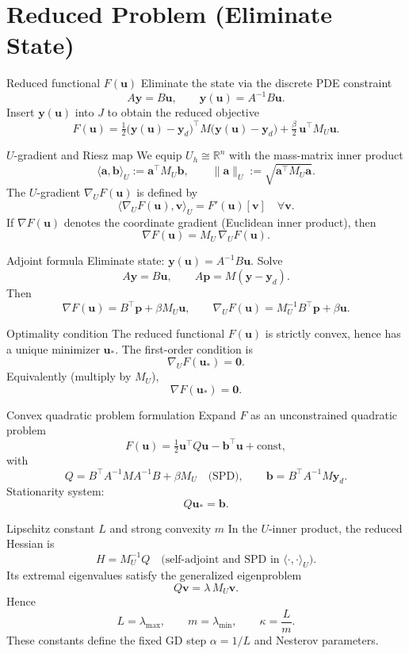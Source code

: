 \documentclass[aspectratio=169,11pt]{beamer}
\begin{document}
\section{Reduced Problem (Eliminate State)}

\begin{frame}{Reduced functional $F(\bm u)$}
Eliminate the state via the discrete PDE constraint
\[
  A\bm y = B\bm u,\qquad \bm y(\bm u)=A^{-1}B\bm u.
\]
Insert $\bm y(\bm u)$ into $J$ to obtain the reduced objective
\[
  F(\bm u)=\tfrac12\big(\bm y(\bm u)-\bm y_d\big)^\top M\big(\bm y(\bm u)-\bm y_d\big)
  +\tfrac{\beta}{2}\,\bm u^\top M_U\bm u.
\]
\end{frame}

\begin{frame}{$U$-gradient and Riesz map}
We equip $U_h\cong\mathbb{R}^n$ with the mass-matrix inner product
\[
  \langle \bm a,\bm b\rangle_U:=\bm a^\top M_U\bm b,\qquad \|\bm a\|_U:=\sqrt{\bm a^\top M_U\bm a}.
\]
The $U$-gradient $\nabla_U F(\bm u)$ is defined by
\[
  \langle \nabla_U F(\bm u),\bm v\rangle_U = F'(\bm u)[\bm v]\quad\forall\bm v.
\]
If $\nabla F(\bm u)$ denotes the coordinate gradient (Euclidean inner product), then
\[
  \nabla F(\bm u)=M_U\,\nabla_U F(\bm u).
\]
\end{frame}

\begin{frame}{Adjoint formula}
Eliminate state: $\bm y(\bm u)=A^{-1}B\bm u$. Solve
\[
  A\bm y=B\bm u,\qquad A\bm p=M(\bm y-\bm y_d).
\]
Then
\[
  \nabla F(\bm u)=B^\top\bm p + \beta M_U\bm u,\qquad
  \nabla_U F(\bm u)=M_U^{-1}B^\top\bm p + \beta\bm u.
\]
\end{frame}

\begin{frame}{Optimality condition}
The reduced functional $F(\bm u)$ is strictly convex, hence has a unique minimizer $\bm u_*$. The first-order condition is
\[
  \nabla_U F(\bm u_*)=\bm 0.
\]
Equivalently (multiply by $M_U$),
\[
  \nabla F(\bm u_*)=\bm 0.
\]
\end{frame}

\begin{frame}{Convex quadratic problem formulation}
Expand $F$ as an unconstrained quadratic problem
\[
  F(\bm u)=\tfrac12\bm u^\top Q\bm u - \bm b^\top\bm u + \text{const},
\]
with
\[
  Q=B^\top A^{-1}MA^{-1}B + \beta M_U\quad\text{(SPD)},\qquad \bm b=B^\top A^{-1}M\bm y_d.
\]
Stationarity system:
\[
  Q\bm u_* = \bm b.
\]
\end{frame}

\begin{frame}{Lipschitz constant $L$ and strong convexity $m$}
In the $U$-inner product, the reduced Hessian is
\[
  H = M_U^{-1}Q \quad\text{(self-adjoint and SPD in }\langle\cdot,\cdot\rangle_U\text{)}.
\]
Its extremal eigenvalues satisfy the generalized eigenproblem
\[
  Q\bm v = \lambda\,M_U\bm v.
\]
Hence
\[
  L=\lambda_{\max},\qquad m=\lambda_{\min},\qquad \kappa=\frac{L}{m}.
\]
These constants define the fixed GD step $\alpha=1/L$ and Nesterov parameters.
\end{frame}
\end{document}
